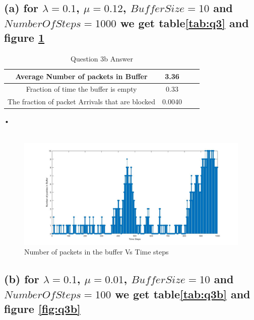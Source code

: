 \documentclass[a4paper,11pt]{article}
\begin{document}
\subsection*{(a) for $\lambda = 0.1$, $\mu=0.12$, $BufferSize=10$ and $NumberOf Steps=1000$ we get table\ref{tab:q3} and figure \ref{fig:q3a} }

\begin{table}
\centering
\begin{tabular}{ |c|c|c|c| } 
\hline
 Average Number of packets in Buffer& 3.36  \\
 \hline
 Fraction of time the buffer is empty& 0.33 \\
 \hline
 The fraction of packet Arrivals that are blocked& 0.0040\\
\hline
\end{tabular}
\caption{Question 3b Answer } \label{tab:q3a}
\end{table}•\\\\
\begin{figure}[h]
   \hspace*{-6cm}
    \includegraphics[scale=0.5]{q3_1}
    \caption{Number of packets in the buffer Vs Time steps}\label{fig:q3a}
\end{figure}
\subsection*{(b) for $\lambda = 0.1$, $\mu=0.01$, $BufferSize=10$ and $NumberOf Steps=100$ we get table\ref{tab:q3b} and figure \ref{fig:q3b} }
\end{document}
